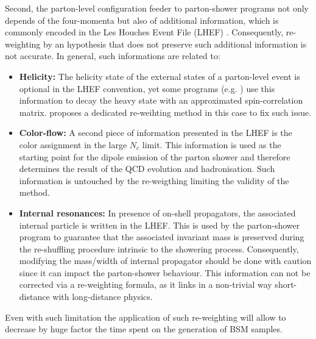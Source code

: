 \documentclass{article}
\begin{document}
Second, the parton-level configuration feeder to parton-shower programs not only depends of the four-momenta but also of additional information, which is commonly encoded in the Les Houches Event File (LHEF) \cite{Alwall:2006yp,Andersen:2014efa}. Consequently, re-weighting  by an hypothesis that does not preserve such  additional information is not accurate. In general, such informations are related to:

\begin{itemize}
\item {\bf Helicity:} The helicity state of the external states of a parton-level event is optional in the LHEF convention, yet some programs (e.g. \cite{Meade:2007js}) use this information to decay the heavy state with an approximated spin-correlation matrix. \cite{Mattelaer:2016gcx,Artoisenet:2012st}
proposes a dedicated re-weihting method in this case to fix such issue.

\item {\bf Color-flow:} A second piece of information presented in the LHEF is the color assignment in the large $N_c$ limit. This information is used as the starting point for the dipole emission of the parton shower and therefore determines the result of the QCD evolution  and hadronisation.  Such information is untouched by the re-weigthing limiting the validity of the method. 

\item {\bf Internal resonances:} In presence of on-shell propagators, the associated internal particle is written in the LHEF. This is used by the parton-shower program to guarantee that the associated invariant mass is preserved during the re-shuffling procedure intrinsic to the showering process. Consequently, modifying the mass/width of internal propagator should be done with caution since it can impact the parton-shower behaviour. This information can not be corrected via a re-weighting formula, as it links in a non-trivial way short-distance with long-distance physics.
\end{itemize}

Even with such limitation the application of such re-weighting will allow to decrease by huge factor the time spent on the generation of BSM samples.
  



\end{document}
